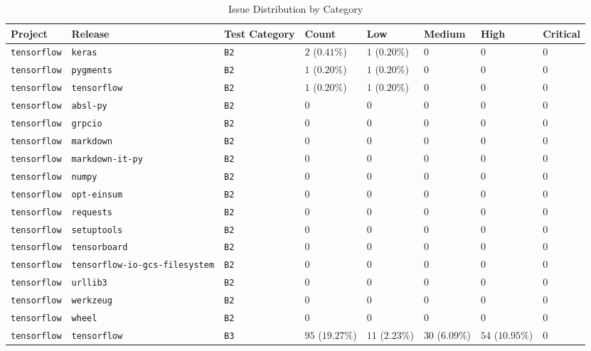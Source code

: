 \begin{table}
\caption{Issue Distribution by Category}
\label{tab:issue-category-distribution}
\begin{tabular}{llllllll}
\toprule
Project & Release & Test Category & Count & Low & Medium & High & Critical \\
\midrule
\texttt{tensorflow} & \texttt{keras} & \texttt{B2} & $2$ ($0.41\%$) & $1$ ($0.20\%$) & $0$ & $0$ & $0$ \\
\texttt{tensorflow} & \texttt{pygments} & \texttt{B2} & $1$ ($0.20\%$) & $1$ ($0.20\%$) & $0$ & $0$ & $0$ \\
\texttt{tensorflow} & \texttt{tensorflow} & \texttt{B2} & $1$ ($0.20\%$) & $1$ ($0.20\%$) & $0$ & $0$ & $0$ \\
\texttt{tensorflow} & \texttt{absl-py} & \texttt{B2} & $0$ & $0$ & $0$ & $0$ & $0$ \\
\texttt{tensorflow} & \texttt{grpcio} & \texttt{B2} & $0$ & $0$ & $0$ & $0$ & $0$ \\
\texttt{tensorflow} & \texttt{markdown} & \texttt{B2} & $0$ & $0$ & $0$ & $0$ & $0$ \\
\texttt{tensorflow} & \texttt{markdown-it-py} & \texttt{B2} & $0$ & $0$ & $0$ & $0$ & $0$ \\
\texttt{tensorflow} & \texttt{numpy} & \texttt{B2} & $0$ & $0$ & $0$ & $0$ & $0$ \\
\texttt{tensorflow} & \texttt{opt-einsum} & \texttt{B2} & $0$ & $0$ & $0$ & $0$ & $0$ \\
\texttt{tensorflow} & \texttt{requests} & \texttt{B2} & $0$ & $0$ & $0$ & $0$ & $0$ \\
\texttt{tensorflow} & \texttt{setuptools} & \texttt{B2} & $0$ & $0$ & $0$ & $0$ & $0$ \\
\texttt{tensorflow} & \texttt{tensorboard} & \texttt{B2} & $0$ & $0$ & $0$ & $0$ & $0$ \\
\texttt{tensorflow} & \texttt{tensorflow-io-gcs-filesystem} & \texttt{B2} & $0$ & $0$ & $0$ & $0$ & $0$ \\
\texttt{tensorflow} & \texttt{urllib3} & \texttt{B2} & $0$ & $0$ & $0$ & $0$ & $0$ \\
\texttt{tensorflow} & \texttt{werkzeug} & \texttt{B2} & $0$ & $0$ & $0$ & $0$ & $0$ \\
\texttt{tensorflow} & \texttt{wheel} & \texttt{B2} & $0$ & $0$ & $0$ & $0$ & $0$ \\
\texttt{tensorflow} & \texttt{tensorflow} & \texttt{B3} & $95$ ($19.27\%$) & $11$ ($2.23\%$) & $30$ ($6.09\%$) & $54$ ($10.95\%$) & $0$ \\

\end{tabular}
\end{table}
